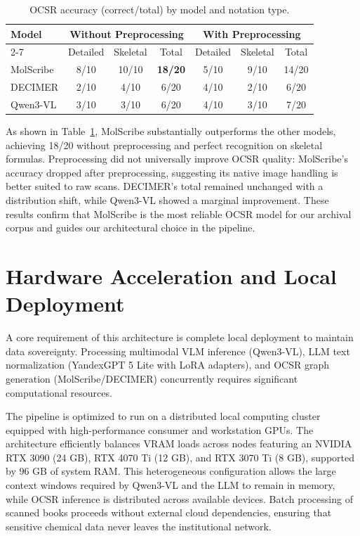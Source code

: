 \documentclass[conference]{IEEEtran}
\begin{document}
\begin{table}[t]
\centering
\small
\caption{OCSR accuracy (correct/total) by model and notation type.}
\label{tab:ocsr}
\begin{tabular}{lcccccc}
\toprule
\multirow{2}{*}{Model} & \multicolumn{3}{c}{Without Preprocessing} & \multicolumn{3}{c}{With Preprocessing} \\
\cline{2-7}
 & Detailed & Skeletal & Total & Detailed & Skeletal & Total \\
\midrule
MolScribe & 8/10 & 10/10 & \textbf{18/20} & 5/10 & 9/10 & 14/20 \\
DECIMER & 2/10 & 4/10 & 6/20 & 4/10 & 2/10 & 6/20 \\
Qwen3-VL & 3/10 & 3/10 & 6/20 & 4/10 & 3/10 & 7/20 \\
\bottomrule
\end{tabular}
\end{table}

As shown in Table~\ref{tab:ocsr}, MolScribe substantially outperforms the other models, achieving 18/20 without preprocessing and perfect recognition on skeletal formulas. Preprocessing did not universally improve OCSR quality: MolScribe's accuracy dropped after preprocessing, suggesting its native image handling is better suited to raw scans. DECIMER's total remained unchanged with a distribution shift, while Qwen3-VL showed a marginal improvement. These results confirm that MolScribe is the most reliable OCSR model for our archival corpus and guides our architectural choice in the pipeline.

\section{Hardware Acceleration and Local Deployment}

A core requirement of this architecture is complete local deployment to maintain data sovereignty. Processing multimodal VLM inference (Qwen3-VL), LLM text normalization (YandexGPT 5 Lite with LoRA adapters), and OCSR graph generation (MolScribe/DECIMER) concurrently requires significant computational resources.

The pipeline is optimized to run on a distributed local computing cluster equipped with high-performance consumer and workstation GPUs. The architecture efficiently balances VRAM loads across nodes featuring an NVIDIA RTX 3090 (24 GB), RTX 4070 Ti (12 GB), and RTX 3070 Ti (8 GB), supported by 96 GB of system RAM. This heterogeneous configuration allows the large context windows required by Qwen3-VL and the LLM to remain in memory, while OCSR inference is distributed across available devices. Batch processing of scanned books proceeds without external cloud dependencies, ensuring that sensitive chemical data never leaves the institutional network.
\end{document}
